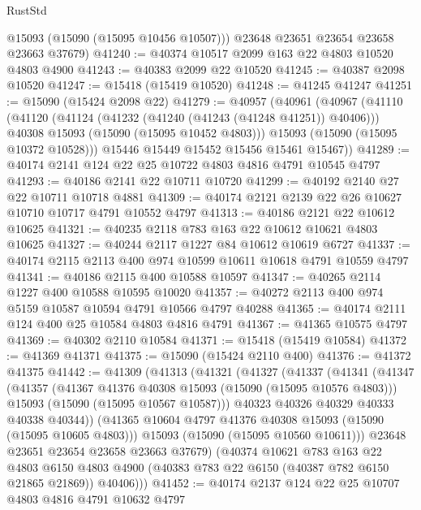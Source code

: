 \begin{lexlean}{RustStd}
\begin{coremodule}
        @15093
        (@15090 (@15095 @10456 @10507)))
      @23648
      @23651
      @23654
      @23658
      @23663
      @37679)
@41240 := @40374 @10517 @2099 @163 @22 @4803 @10520 @4803 @4900
@41243 := @40383 @2099 @22 @10520
@41245 := @40387 @2098 @10520
@41247 := @15418 (@15419 @10520)
@41248 := @41245 @41247
@41251 := @15090 (@15424 @2098 @22)
@41279 := @40957
    (@40961
      (@40967
        (@41110
          (@41120
            (@41124 (@41232 (@41240 (@41243 (@41248 @41251)) @40406)))
            @40308
            @15093
            (@15090 (@15095 @10452 @4803)))
          @15093
          (@15090 (@15095 @10372 @10528)))
        @15446
        @15449
        @15452
        @15456
        @15461
        @15467))
@41289 := @40174 @2141 @124 @22 @25 @10722 @4803 @4816 @4791 @10545 @4797
@41293 := @40186 @2141 @22 @10711 @10720
@41299 := @40192 @2140 @27 @22 @10711 @10718 @4881
@41309 := @40174 @2121 @2139 @22 @26 @10627 @10710 @10717 @4791 @10552 @4797
@41313 := @40186 @2121 @22 @10612 @10625
@41321 := @40235 @2118 @783 @163 @22 @10612 @10621 @4803 @10625
@41327 := @40244 @2117 @1227 @84 @10612 @10619 @6727
@41337 := @40174 @2115 @2113 @400 @974 @10599 @10611 @10618 @4791 @10559 @4797
@41341 := @40186 @2115 @400 @10588 @10597
@41347 := @40265 @2114 @1227 @400 @10588 @10595 @10020
@41357 := @40272 @2113 @400 @974 @5159 @10587 @10594 @4791 @10566 @4797 @40288
@41365 := @40174 @2111 @124 @400 @25 @10584 @4803 @4816 @4791
@41367 := @41365 @10575 @4797
@41369 := @40302 @2110 @10584
@41371 := @15418 (@15419 @10584)
@41372 := @41369 @41371
@41375 := @15090 (@15424 @2110 @400)
@41376 := @41372 @41375
@41442 := @41309
    (@41313
      (@41321
        (@41327
          (@41337
            (@41341
              (@41347
                (@41357
                  (@41367 @41376 @40308 @15093 (@15090 (@15095 @10576 @4803)))
                  @15093
                  (@15090 (@15095 @10567 @10587)))
                @40323
                @40326
                @40329
                @40333
                @40338
                @40344))
            (@41365 @10604 @4797 @41376 @40308 @15093 (@15090 (@15095 @10605 @4803)))
            @15093
            (@15090 (@15095 @10560 @10611)))
          @23648
          @23651
          @23654
          @23658
          @23663
          @37679)
        (@40374
          @10621
          @783
          @163
          @22
          @4803
          @6150
          @4803
          @4900
          (@40383 @783 @22 @6150 (@40387 @782 @6150 @21865 @21869))
          @40406)))
@41452 := @40174 @2137 @124 @22 @25 @10707 @4803 @4816 @4791 @10632 @4797

\end{coremodule}
\end{lexlean}
